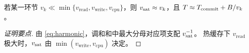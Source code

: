 \begin{proposition}[瓶颈支配]
\label{prop:bottleneck}
若某一环节 $v_k \ll \min\{v_{\mathrm{read}}, v_{\mathrm{write}}, v_{\mathrm{cpu}}\}$，则
$v_{\mathrm{sat}} \approx v_k$，且 $T \approx T_{\mathrm{commit}} + B/v_k$。
\end{proposition}

\begin{proof}[证明要点]
由 \cref{eq:harmonic}，调和和中最大分母对应项支配 $v_{\mathrm{sat}}^{-1}$。
热缓存下 $v_{\mathrm{read}}$ 极大时，$v_{\mathrm{sat}}$ 由 $\min(v_{\mathrm{write}}, v_{\mathrm{cpu}})$ 决定。
\end{proof}
